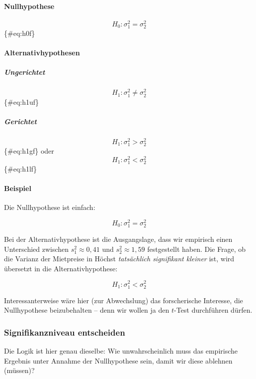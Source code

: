 \documentclass[
  ngerman,
]{article}
\begin{document}
\hypertarget{nullhypothese-3}{%
\paragraph{Nullhypothese}\label{nullhypothese-3}}

\[
H_0: \sigma^2_1=\sigma^2_2
\]\{\#eq:h0f\}

\hypertarget{alternativhypothesen}{%
\paragraph{Alternativhypothesen}\label{alternativhypothesen}}

\hypertarget{ungerichtet}{%
\subparagraph{Ungerichtet}\label{ungerichtet}}

\[
H_1: \sigma^2_1\neq\sigma^2_2
\]\{\#eq:h1uf\}

\hypertarget{gerichtet}{%
\subparagraph{Gerichtet}\label{gerichtet}}

\[
H_1: \sigma^2_1>\sigma^2_2
\]\{\#eq:h1gf\}
oder
\[
H_1: \sigma^2_1<\sigma^2_2
\]\{\#eq:h1lf\}

\hypertarget{beispiel-18}{%
\paragraph{Beispiel}\label{beispiel-18}}

Die Nullhypothese ist einfach:

\[
H_0: \sigma^2_1=\sigma^2_2
\]

Bei der Alternativhypothese ist die Ausgangslage, dass wir empirisch einen Unterschied zwischen \(s^2_1\approx0{,}41\) und \(s^2_2\approx1{,}59\) festgestellt haben. Die Frage, ob die Varianz der Mietpreise in Höchst \emph{tatsächlich signifikant kleiner} ist, wird übersetzt in die Alternativhypothese:

\[
H_1: \sigma^2_1<\sigma^2_2
\]

Interessanterweise wäre hier (zur Abwechslung) das forscherische Interesse, die Nullhypothese beizubehalten -- denn wir wollen ja den \(t\)-Test durchführen dürfen.

\hypertarget{signifikanzniveau-entscheiden-3}{%
\subsubsection{Signifikanzniveau entscheiden}\label{signifikanzniveau-entscheiden-3}}

Die Logik ist hier genau dieselbe: Wie unwahrscheinlich muss das empirische Ergebnis unter Annahme der Nullhypothese sein, damit wir diese ablehnen (müssen)?
\end{document}
